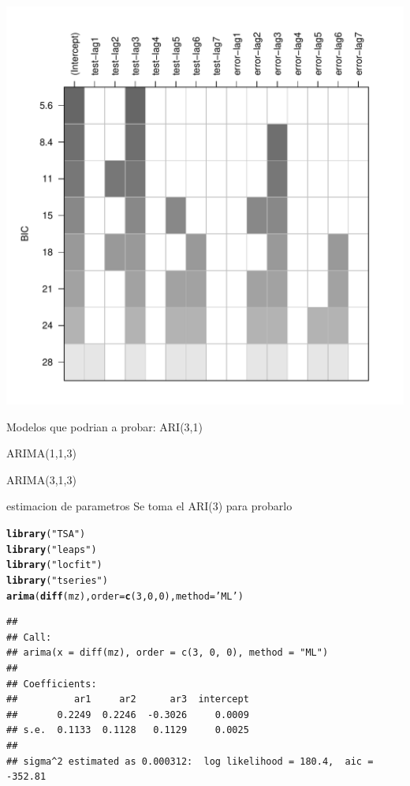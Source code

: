 \documentclass{article}\usepackage[]{graphicx}\usepackage[]{color}
\makeatletter
\def\maxwidth{ %
  \ifdim\Gin@nat@width>\linewidth
    \linewidth
  \else
    \Gin@nat@width
  \fi
}
\newcommand{\hlnum}[1]{\textcolor[rgb]{0.686,0.059,0.569}{#1}}%
\newcommand{\hlstr}[1]{\textcolor[rgb]{0.192,0.494,0.8}{#1}}%
\newcommand{\hlstd}[1]{\textcolor[rgb]{0.345,0.345,0.345}{#1}}%
\newcommand{\hlkwc}[1]{\textcolor[rgb]{0.333,0.667,0.333}{#1}}%
\newcommand{\hlkwd}[1]{\textcolor[rgb]{0.737,0.353,0.396}{\textbf{#1}}}%
\newenvironment{kframe}{%
 \def\at@end@of@kframe{}%
 \ifinner\ifhmode%
  \def\at@end@of@kframe{\end{minipage}}%
  \begin{minipage}{\columnwidth}%
 \fi\fi%
 \def\FrameCommand##1{\hskip\@totalleftmargin \hskip-\fboxsep
 \colorbox{shadecolor}{##1}\hskip-\fboxsep
     \hskip-\linewidth \hskip-\@totalleftmargin \hskip\columnwidth}%
 \MakeFramed {\advance\hsize-\width
   \@totalleftmargin\z@ \linewidth\hsize
   \@setminipage}}%
 {\par\unskip\endMakeFramed%
 \at@end@of@kframe}
\newenvironment{knitrout}{}{} %
\makeatother
\begin{document}
\begin{knitrout}
\includegraphics[width=\maxwidth]{figure/unnamed-chunk-2-3} 

\end{knitrout}

Modelos que podrian a probar:
ARI(3,1)

ARIMA(1,1,3)

ARIMA(3,1,3)

estimacion de parametros
Se toma el ARI(3) para probarlo
\begin{knitrout}
\color{fgcolor}\begin{kframe}
\begin{alltt}
\hlkwd{library}\hlstd{(}\hlstr{"TSA"}\hlstd{)}
\hlkwd{library}\hlstd{(}\hlstr{"leaps"}\hlstd{)}
\hlkwd{library}\hlstd{(}\hlstr{"locfit"}\hlstd{)}
\hlkwd{library}\hlstd{(}\hlstr{"tseries"}\hlstd{)}
\hlkwd{arima}\hlstd{(}\hlkwd{diff}\hlstd{(mz),} \hlkwc{order}\hlstd{=}\hlkwd{c}\hlstd{(}\hlnum{3}\hlstd{,}\hlnum{0}\hlstd{,}\hlnum{0}\hlstd{),}\hlkwc{method}\hlstd{=}\hlstr{'ML'}\hlstd{)}
\end{alltt}
\begin{verbatim}
## 
## Call:
## arima(x = diff(mz), order = c(3, 0, 0), method = "ML")
## 
## Coefficients:
##          ar1     ar2      ar3  intercept
##       0.2249  0.2246  -0.3026     0.0009
## s.e.  0.1133  0.1128   0.1129     0.0025
## 
## sigma^2 estimated as 0.000312:  log likelihood = 180.4,  aic = -352.81
\end{verbatim}
\end{kframe}
\end{knitrout}
\end{document}
